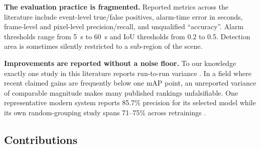 \documentclass[10pt,twocolumn,a4paper]{article}
\begin{document}
\textbf{The evaluation practice is fragmented.} Reported metrics across the
literature include event-level true/false positives, alarm-time error in seconds,
frame-level and pixel-level precision/recall, and unqualified ``accuracy''. Alarm
thresholds range from 5~s to 60~s and IoU thresholds from 0.2 to 0.5. Detection
area is sometimes silently restricted to a sub-region of the scene.

\textbf{Improvements are reported without a noise floor.} To our knowledge exactly
one study in this literature reports run-to-run variance \cite{smith2006pets}. In
a field where recent claimed gains are frequently below one mAP point, an
unreported variance of comparable magnitude makes many published rankings
unfalsifiable. One representative modern system reports 85.7\% precision for its
selected model while its own random-grouping study spans 71--75\% across
retrainings \cite{zhou2024sao}.

\subsection{Contributions}
\end{document}
